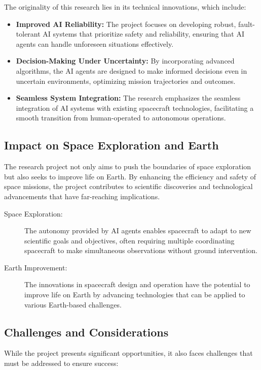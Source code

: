 \documentclass[a4paper, 11pt]{article}
\begin{document}
The originality of this research lies in its technical innovations, which include:

\begin{itemize}
    \item \textbf{Improved AI Reliability:} The project focuses on developing robust, fault-tolerant AI systems that prioritize safety and reliability, ensuring that AI agents can handle unforeseen situations effectively.
    \item \textbf{Decision-Making Under Uncertainty:} By incorporating advanced algorithms, the AI agents are designed to make informed decisions even in uncertain environments, optimizing mission trajectories and outcomes.
    \item \textbf{Seamless System Integration:} The research emphasizes the seamless integration of AI systems with existing spacecraft technologies, facilitating a smooth transition from human-operated to autonomous operations.
\end{itemize}

\subsection{Impact on Space Exploration and Earth}

The research project not only aims to push the boundaries of space exploration but also seeks to improve life on Earth. By enhancing the efficiency and safety of space missions, the project contributes to scientific discoveries and technological advancements that have far-reaching implications.

\begin{description}
    \item[Space Exploration:] The autonomy provided by AI agents enables spacecraft to adapt to new scientific goals and objectives, often requiring multiple coordinating spacecraft to make simultaneous observations without ground intervention.
    \item[Earth Improvement:] The innovations in spacecraft design and operation have the potential to improve life on Earth by advancing technologies that can be applied to various Earth-based challenges.
\end{description}

\subsection{Challenges and Considerations}

While the project presents significant opportunities, it also faces challenges that must be addressed to ensure success:
\end{document}
